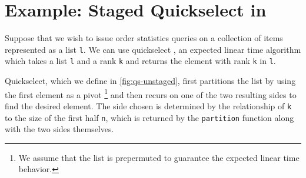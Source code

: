 
\section {Example: Staged Quickselect in \texorpdfstring{\lang}{λ12}}
\label{sec:staging}

\begin{concretesyntax}





Suppose that we wish to issue order statistics queries on a collection of items
represented as a list \texttt{l}. We can use quickselect \cite{quickselect}, an
expected linear time algorithm which takes a list \texttt{l} and a rank
\texttt{k} and returns the element with rank \texttt{k} in \texttt{l}.

Quickselect, which we define in \ref{fig:qs-unstaged}, first partitions the list
by using the first element as a pivot%
\footnote{We assume that the list is prepermuted to guarantee the expected
linear time behavior.}
and then recurs on one of the two resulting sides to find the desired element.
The side chosen is determined by the relationship of \texttt{k} to the size of
the first half \texttt{n}, which is returned by the \texttt{partition} function
along with the two sides themselves.


\end{concretesyntax}
